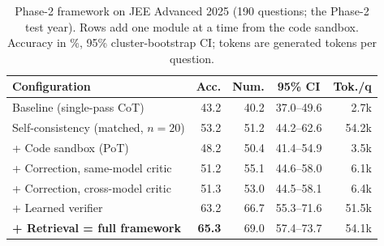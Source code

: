 \begin{table}[!t]
\centering
\footnotesize
\caption{Phase-2 framework on JEE Advanced 2025 (190 questions; the Phase-2 test year). Rows add one module at a time from the code sandbox. Accuracy in \%, 95\% cluster-bootstrap CI; tokens are generated tokens per question.}
\label{tab:p2}
\setlength{\tabcolsep}{3pt}
\begin{tabular}{lrrcr}
\toprule
Configuration & Acc. & Num. & 95\% CI & Tok./q \\
\midrule
Baseline (single-pass CoT) & 43.2 & 40.2 & 37.0--49.6 & 2.7k \\
Self-consistency (matched, $n{=}20$) & 53.2 & 51.2 & 44.2--62.6 & 54.2k \\
+ Code sandbox (PoT) & 48.2 & 50.4 & 41.4--54.9 & 3.5k \\
+ Correction, same-model critic & 51.2 & 55.1 & 44.6--58.0 & 6.1k \\
+ Correction, cross-model critic & 51.3 & 53.0 & 44.5--58.1 & 6.4k \\
+ Learned verifier & 63.2 & 66.7 & 55.3--71.6 & 51.5k \\
\textbf{+ Retrieval = full framework} & \textbf{65.3} & 69.0 & 57.4--73.7 & 54.1k \\
\bottomrule
\end{tabular}
\end{table}
